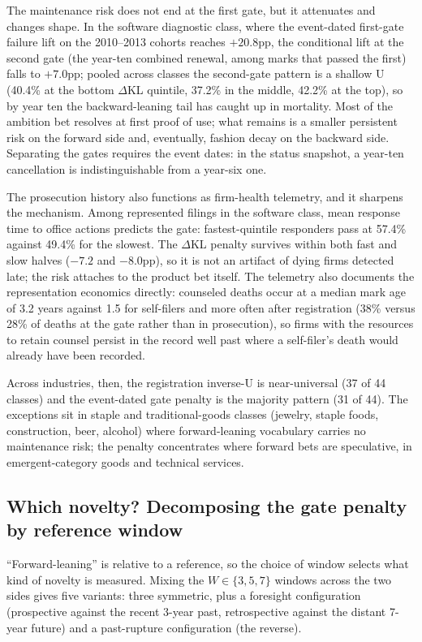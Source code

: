 \documentclass[11pt]{article}
\newcommand{\dkl}{$\Delta$KL}
\begin{document}
The maintenance risk does not end at the first gate, but it attenuates
and changes shape. In the software diagnostic class, where the
event-dated first-gate failure lift on the 2010--2013 cohorts reaches
$+20.8$pp, the conditional lift at the second gate (the year-ten combined
renewal, among marks that passed the first) falls to $+7.0$pp; pooled
across classes the second-gate pattern is a shallow U (40.4\% at the
bottom \dkl{} quintile, 37.2\% in the middle, 42.2\% at the top), so by
year ten the backward-leaning tail has caught up in mortality. Most of
the ambition bet resolves at first proof of use; what remains is a
smaller persistent risk on the forward side and, eventually, fashion
decay on the backward side. Separating the gates requires the event
dates: in the status snapshot, a year-ten cancellation is
indistinguishable from a year-six one.

The prosecution history also functions as firm-health telemetry, and it
sharpens the mechanism. Among represented filings in the software class,
mean response time to office actions predicts the gate: fastest-quintile
responders pass at 57.4\% against 49.4\% for the slowest. The \dkl{}
penalty survives within both fast and slow halves ($-7.2$ and $-8.0$pp),
so it is not an artifact of dying firms detected late; the risk attaches
to the product bet itself. The telemetry also documents the representation economics directly:
counseled deaths occur at a median mark age of 3.2 years against 1.5 for
self-filers and more often after registration (38\% versus 28\% of deaths
at the gate rather than in prosecution), so firms with the resources to
retain counsel persist in the record well past where a self-filer's death
would already have been recorded.

Across industries, then, the registration inverse-U is near-universal (37
of 44 classes) and the event-dated gate penalty is the majority pattern
(31 of 44). The exceptions sit in staple and traditional-goods classes
(jewelry, staple foods, construction, beer, alcohol) where forward-leaning
vocabulary carries no maintenance risk; the penalty concentrates where
forward bets are speculative, in emergent-category goods and technical
services.

\subsection{Which novelty? Decomposing the gate penalty by reference window}\label{sec:windows}

``Forward-leaning'' is relative to a reference, so the choice of window
selects what kind of novelty is measured. Mixing the $W \in \{3, 5, 7\}$
windows across the two sides gives five variants: three symmetric, plus a
foresight configuration (prospective against the recent 3-year past,
retrospective against the distant 7-year future) and a past-rupture
configuration (the reverse).
\end{document}
